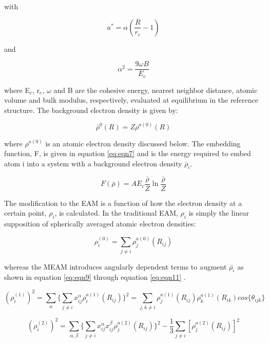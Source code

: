 \documentclass[review]{elsarticle}
\begin{document}
with

\begin{equation}
\label{eq:eqn4}
a^{*} = \alpha ( \frac{R}{r_{e}} - 1)
\end{equation}

and

\begin{equation}
\label{eq:eqn5}
\alpha^{2} = \frac{9\omega B}{E_{c}}
\end{equation}

where E$_{c}$, r$_{e}$, $\omega$ and B are the cohesive energy, nearest neighbor distance, atomic volume and bulk modulus, respectively, evaluated at equilibrium in the reference structure.  The background electron density is given by:

\begin{equation}
\label{eq:eqn6}
\bar{\rho}^{0}(R) = Z \rho^{a(0)} (R)
\end{equation}

where $\rho^{a(0)}$  is an atomic electron density discussed below.  The embedding function, F, is given in equation \ref{eq:eqn7} and is the energy required to embed atom i into a system with a background electron density $\bar{\rho}_{i}$.  

\begin{equation}
\label{eq:eqn7}
F(\bar{\rho}) = AE_{c} \frac{\bar{\rho}}{Z}\ln\frac{\bar{\rho}}{Z}
\end{equation}

The modification to the EAM is a function of how the electron density at a certain point, $\rho_{i}$, is calculated.  In the traditional EAM, $\rho_{i}$ is simply the linear supposition of spherically averaged atomic electron densities:

\begin{equation}
\label{eq:eqn8}
\rho_{i}^{(0)} = \sum_{j \neq i} \rho_{j}^{a(0)} (R_{ij})
\end{equation}

whereas the MEAM introduces angularly dependent terms to augment $\bar{\rho_{i}}$ as shown in equation \ref{eq:eqn9} through equation \ref{eq:eqn11} \cite{baskes2000, baskes1987}.  

\begin{equation}
\label{eq:eqn9}
(\rho_{i}^{(1)})^{2}=\sum_{\alpha} \{ \sum_{j \neq i}x_{ij}^{\alpha}\rho_{i}^{a(1)}(R_{ij})\}^{2} = \sum_{j,k \neq i}\rho_{j}^{a(1)}(R_{ij})\rho_{k}^{a(1)}(R_{ik})cos\{\theta_{ijk}\}
\end{equation}

\begin{equation}
\label{eq:eqn10}
(\rho_{i}^{(2)})^{2}=\sum_{\alpha,\beta}\{\sum_{j \neq i}x_{ij}^{\alpha}x_{ij}^{\beta}\rho_{j}^{a(2)}(R_{ij})\}^{2} - \frac{1}{3}\sum_{j \neq i}[\rho_{j}^{a(2)}(R_{ij})]^2
\end{equation}
\end{document}
